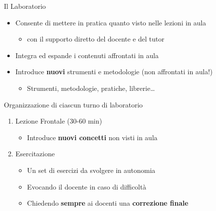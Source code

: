 \documentclass[xcolor=dvipsnames,presentation]{beamer}
\begin{document}
\begin{frame}{Il Laboratorio}

\begin{itemize}
    \item Consente di mettere in pratica quanto visto nelle lezioni in aula
    \begin{itemize}
        \item con il supporto diretto del docente e del tutor
    \end{itemize}
    \item Integra ed espande i contenuti affrontati in aula
    \item Introduce \textbf{nuovi} strumenti e metodologie (non affrontati in aula!)
    \begin{itemize}
        \item Strumenti, metodologie, pratiche, librerie\dots{}
    \end{itemize}
\end{itemize}

\begin{block}{Organizzazione di ciascun turno di laboratorio}
    \begin{enumerate}
        \item Lezione Frontale (30-60 min)
        \begin{itemize}
            \item Introduce \textbf{nuovi concetti} non visti in aula
        \end{itemize}
        \item Esercitazione
        \begin{itemize}
            \item Un set di esercizi da svolgere in autonomia
            \item Evocando il docente in caso di difficoltà
            \item Chiedendo \textbf{sempre} ai docenti una \textbf{correzione finale}
        \end{itemize}
    \end{enumerate}
\end{block}
\end{frame}
\end{document}
